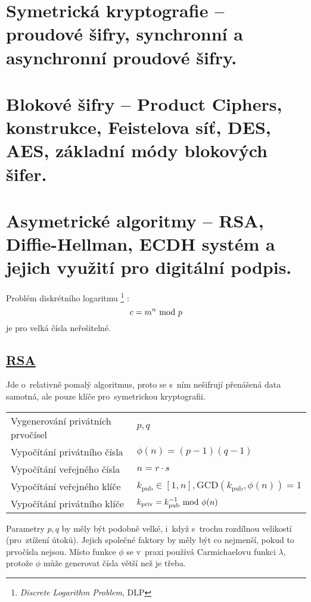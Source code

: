 \clearpage
\section{Symetrická kryptografie -- proudové šifry, synchronní a asynchronní proudové šifry.}
\label{question-4}

\clearpage
\section{Blokové šifry -- Product Ciphers, konstrukce, Feistelova síť, DES, AES, základní módy blokových šifer.}

\clearpage
\section{Asymetrické algoritmy -- RSA, Diffie-Hellman, ECDH systém a jejich využití pro digitální podpis.}

Problém diskrétního logaritmu%
\footnote{\emph{Discrete Logarithm Problem}, DLP}%
: $$c = m^n \ \mathrm{mod}\ p$$ je pro velká čísla neřešitelné.

\subsection[RSA]{\href{https://en.wikipedia.org/wiki/RSA_(cryptosystem)}{RSA}}

Jde o~relativně pomalý algoritmus, proto se s~ním nešifrují přenášená data samotná, ale pouze klíče pro~symetrickou kryptografii.

\begin{table}[ht]
\begin{tabular}{ll}
Vygenerování privátních prvočísel & $p, q$ \\
Vypočítání privátního čísla & $\phi(n) = (p-1)(q-1)$ \\
Vypočítání veřejného čísla & $n = r \cdot s$ \\
Vypočítání veřejného klíče & $k_{\mathrm{pub}} \in [1, n], \mathrm{GCD}(k_{\mathrm{pub}}, \phi(n)) = 1$ \\
Vypočítání privátního klíče & $k_{\mathrm{priv}} = k_{\mathrm{pub}}^{-1} \ \mathrm{mod}\ \phi(n)$ \\
\end{tabular}
\end{table}

Parametry $p, q$ by měly být podobně velké, i~když s~trochu rozdílnou velikostí (pro~ztížení útoků). Jejich společné faktory by měly být co nejmenší, pokud to prvočísla nejsou. Místo funkce $\phi$ se v~praxi používá Carmichaelovu funkci $\lambda$, protože $\phi$ může generovat čísla větší než je třeba.


